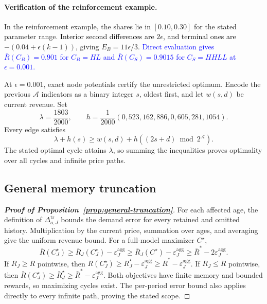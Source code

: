 \paragraph{Verification of the reinforcement example.}
In the reinforcement example, the shares lie in \([0.10,0.30]\) for the stated parameter range. \textcolor{black}{Interior second differences are \(2\epsilon\), and terminal ones are} \(-(0.04+\epsilon(k-1))\), giving \(E_B=11\epsilon/3\). \textcolor{blue}{Direct evaluation gives \(\bar R(C_B)=0.901\) for \(C_B=HL\) and \(\bar R(C_S)=0.9015\) for \(C_S=HHLL\) at \(\epsilon=0.001\).}

At \(\epsilon=0.001\), exact node potentials certify the unrestricted optimum. Encode the previous \(\mathcal A\) indicators as a binary integer \(s\), oldest first, and let \(w(s,d)\) be current revenue. Set
\[
 \lambda=\frac{1803}{2000},\qquad
 h=\frac1{2000}(0,523,162,886,0,605,281,1054).
\]
Every edge satisfies
\[
 \lambda+h(s)\ge w(s,d)+h((2s+d)\bmod 2^{\mathcal A}).
\]
The stated optimal cycle attains \(\lambda\), so summing the inequalities proves optimality over all cycles and infinite price paths.

\subsection{General memory truncation}
\label{app:general-truncation}
\begin{proof}[\normalfont\bfseries Proof of Proposition~\ref{prop:general-truncation}]
For each affected age, the definition of \(\Delta^{\mathrm{tr}}_{a,J}\) bounds the demand error for every retained and omitted history. Multiplication by the current price, summation over ages, and averaging give the uniform revenue bound. For a full-model maximizer \(C^\star\),
\[
 \bar R(C_J^\star)
 \ge\bar R_J(C_J^\star)-\varepsilon_J^{\mathrm{agg}}
 \ge\bar R_J(C^\star)-\varepsilon_J^{\mathrm{agg}}
 \ge\bar R^*-2\varepsilon_J^{\mathrm{agg}}.
\]
If \(\bar R_J\ge\bar R\) pointwise, then
\(\bar R(C_J^\star)\ge\bar R_J^\star-\varepsilon_J^{\mathrm{agg}}
\ge\bar R^*-\varepsilon_J^{\mathrm{agg}}\).
If \(\bar R_J\le\bar R\) pointwise, then
\(\bar R(C_J^\star)\ge\bar R_J^\star\ge\bar R^*-\varepsilon_J^{\mathrm{agg}}\).
Both objectives have finite memory and bounded rewards, so maximizing cycles exist. The per-period error bound also applies directly to every infinite path, proving the stated scope.
\end{proof}

